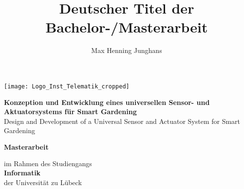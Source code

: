 

\newcommand{\titlepageskip}{\vskip 20pt}

\begin{titlepage}

\title{Deutscher Titel der Bachelor-/Masterarbeit}
\author{Max Henning Junghans}

{\Large
	\texttt{[image: Logo\_Inst\_Telematik\_cropped]}
	\vskip 44pt


	\textbf{\LARGE Konzeption und Entwicklung eines universellen Sensor- und Aktuatorsystems für Smart Gardening}\\
	\LARGE Design and Development of a Universal Sensor and Actuator System for Smart Gardening

	\titlepageskip
	\textbf{Masterarbeit}

	\titlepageskip
	im Rahmen des Studiengangs\\
	\textbf{Informatik}\\
	der Universität zu Lübeck

}
\end{titlepage}
